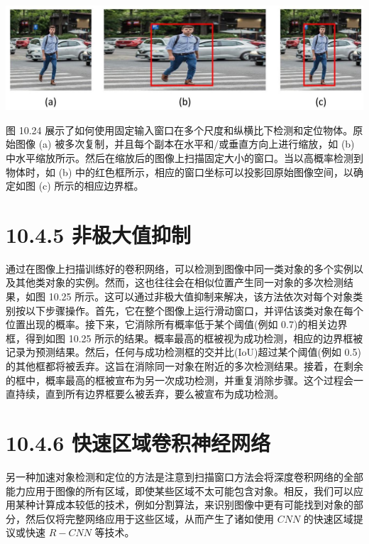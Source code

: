 \documentclass[10pt]{article}
\begin{document}
\begin{center}
\includegraphics[max width=1.0\textwidth]{images/0194e279-9b28-703a-88f4-c3ac21e2010d_333_227_348_1339_391_0.jpg}
\end{center}
\hspace*{3em} 

图 10.24 展示了如何使用固定输入窗口在多个尺度和纵横比下检测和定位物体。原始图像 (a) 被多次复制，并且每个副本在水平和/或垂直方向上进行缩放，如 (b) 中水平缩放所示。然后在缩放后的图像上扫描固定大小的窗口。当以高概率检测到物体时，如 (b) 中的红色框所示，相应的窗口坐标可以投影回原始图像空间，以确定如图 (c) 所示的相应边界框。

\section*{10.4.5 非极大值抑制}

通过在图像上扫描训练好的卷积网络，可以检测到图像中同一类对象的多个实例以及其他类对象的实例。然而，这也往往会在相似位置产生同一对象的多次检测结果，如图 10.25 所示。这可以通过非极大值抑制来解决，该方法依次对每个对象类别按以下步骤操作。首先，它在整个图像上运行滑动窗口，并评估该类对象在每个位置出现的概率。接下来，它消除所有概率低于某个阈值(例如 0.7)的相关边界框，得到如图 10.25 所示的结果。概率最高的框被视为成功检测，相应的边界框被记录为预测结果。然后，任何与成功检测框的交并比(IoU)超过某个阈值(例如 0.5)的其他框都将被丢弃。这旨在消除同一对象在附近的多次检测结果。接着，在剩余的框中，概率最高的框被宣布为另一次成功检测，并重复消除步骤。这个过程会一直持续，直到所有边界框要么被丢弃，要么被宣布为成功检测。

\section*{10.4.6 快速区域卷积神经网络}

另一种加速对象检测和定位的方法是注意到扫描窗口方法会将深度卷积网络的全部能力应用于图像的所有区域，即使某些区域不太可能包含对象。相反，我们可以应用某种计算成本较低的技术，例如分割算法，来识别图像中更有可能找到对象的部分，然后仅将完整网络应用于这些区域，从而产生了诸如使用 \({CNN}\) 的快速区域提议或快速 \(R - {CNN}\) 等技术。
\end{document}
